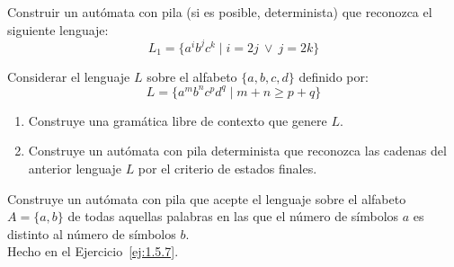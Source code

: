\begin{ejercicio}\label{ej:1.5.25}
    Construir un autómata con pila (si es posible, determinista) que reconozca el siguiente lenguaje:
    \begin{equation*}
        L_1 = \{a^i b^j c^k \mid i = 2j\ \lor\ j = 2k\}
    \end{equation*}

\end{ejercicio}

\begin{ejercicio}\label{ej:1.5.26}
    Considerar el lenguaje $L$ sobre el alfabeto $\{a,b,c,d\}$ definido por:
    \begin{equation*}
        L = \{a^m b^n c^p d^q \mid m+n\geq p+q\}
    \end{equation*}
    \begin{enumerate}
        \item Construye una gramática libre de contexto que genere $L$.
        
        \item Construye un autómata con pila determinista que reconozca las cadenas del anterior lenguaje $L$ por el criterio de estados finales.
    \end{enumerate}
\end{ejercicio}

\begin{ejercicio}\label{ej:1.5.27}
    Construye un autómata con pila que acepte el lenguaje sobre el alfabeto $A = \{a,b\}$ de todas aquellas palabras en las que el número de símbolos $a$ es distinto al número de símbolos $b$.\\

    Hecho en el Ejercicio~\ref{ej:1.5.7}.
\end{ejercicio}

